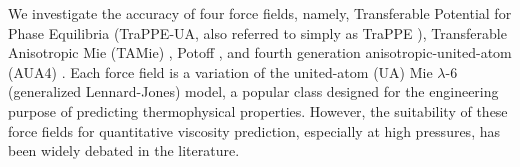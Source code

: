 \documentclass[preprint,review,12pt]{elsarticle}
\begin{document}
	 We investigate the accuracy of four force fields, namely, Transferable Potential for Phase Equilibria (TraPPE-UA, also referred to simply as TraPPE \cite{TraPPE,Martin1999,TraPPEUA2}), Transferable Anisotropic Mie (TAMie) \cite{TAMie,Weidler2016}, Potoff \cite{Mie,Potoff_branched}, and fourth generation anisotropic-united-atom (AUA4) \cite{AUA4,Nieto2008}. Each force field is a variation of the united-atom (UA) Mie $\lambda$-6 (generalized Lennard-Jones) model, a popular class designed for the engineering purpose of predicting thermophysical properties. However, the suitability of these force fields for quantitative viscosity prediction, especially at high pressures, has been widely debated in the literature.
	 
	
	
	
	
	
\end{document}
